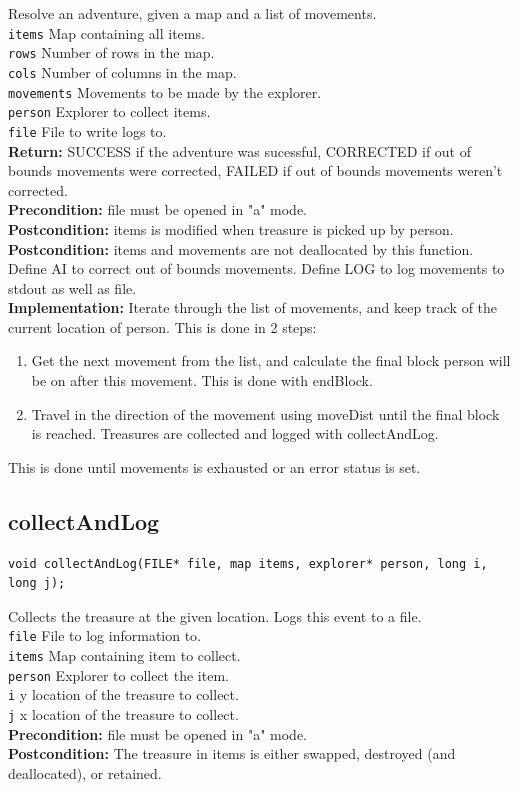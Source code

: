 \documentclass{article}
\begin{document}
 Resolve an adventure, given a map and a list of movements.\\ 
 \texttt{items} Map containing all items.\\ 
 \texttt{rows} Number of rows in the map.\\ 
 \texttt{cols} Number of columns in the map.\\ 
 \texttt{movements} Movements to be made by the explorer.\\ 
 \texttt{person} Explorer to collect items.\\ 
 \texttt{file} File to write logs to.\\ 
 \textbf{Return:} SUCCESS if the adventure was sucessful,
         CORRECTED if out of bounds movements were corrected,
         FAILED if out of bounds movements weren't corrected.\\ 
 \textbf{Precondition:}  file must be opened in "a" mode.\\ 
 \textbf{Postcondition:}  items is modified when  treasure is picked up by  person.\\ 
 \textbf{Postcondition:}  items and  movements are not deallocated by this function.
 Define AI to correct out of bounds movements.
         Define LOG to log movements to stdout as well as  file.\\
 \textbf{Implementation:}
Iterate through the list of movements, and keep track of the current location of  person.
This is done in 2 steps:
    \begin{enumerate}
     \item Get the next movement from the list, and calculate the final block  person will be on after this movement.
         This is done with  endBlock.
     \item Travel in the direction of the movement using  moveDist until the final block is reached.
         Treasures are collected and logged with  collectAndLog. 
    \end{enumerate}
 This is done until  movements is exhausted or an error status is set.


\subsection{collectAndLog}
\begin{lstlisting}
void collectAndLog(FILE* file, map items, explorer* person, long i, long j);
\end{lstlisting}


 Collects the treasure at the given location. Logs this event to a file.\\ 
 \texttt{file} File to log information to.\\ 
 \texttt{items} Map containing item to collect.\\ 
 \texttt{person} Explorer to collect the item.\\ 
 \texttt{i} y location of the treasure to collect.\\ 
 \texttt{j} x location of the treasure to collect.\\ 
 \textbf{Precondition:}  file must be opened in "a" mode.\\ 
 \textbf{Postcondition:} The treasure in items is either swapped, destroyed (and deallocated), or retained.\\ 
 
\end{document}
